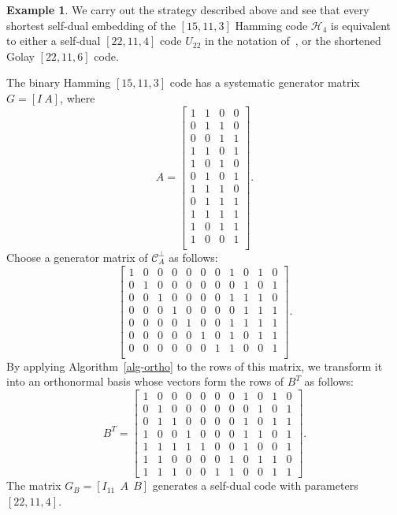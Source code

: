 \documentclass{article}
\theoremstyle{definition}
\newtheorem{example}{Example}[section]
\theoremstyle{remark}
\begin{document}
\begin{example}
We carry out the strategy described above and see that every shortest self-dual embedding of the $[15, 11, 3]$ Hamming code $\mathcal H_4$ is equivalent to either a self-dual $[22, 11, 4]$ code $U_{22}$ in the notation of~\cite{Pless1975}, or the shortened Golay $[22, 11, 6]$ code.

  The binary Hamming $[15, 11, 3]$ code has a systematic generator matrix $G= \left[ I \ A \right]$, where
  \[
    A= \left[\begin{array}{cccc}
       1& 1& 0& 0 \\
       0 &1& 1& 0 \\
       0& 0& 1& 1 \\
       1& 1& 0& 1 \\
       1& 0& 1& 0 \\
       0& 1& 0& 1 \\
       1& 1& 1& 0 \\
       0& 1& 1& 1 \\
       1& 1& 1& 1 \\
       1& 0& 1& 1 \\
       1& 0& 0& 1 \\
    \end{array}\right].
  \]
 Choose a generator matrix of $\mathcal{C}_A^\perp$ as follows:
  \[ \left[\begin{array}{ccccccccccc}
    1& 0 &0& 0& 0& 0& 0 &1& 0& 1& 0 \\
    0& 1& 0& 0& 0& 0& 0& 0& 1& 0& 1 \\
    0& 0& 1& 0& 0& 0& 0& 1& 1& 1& 0 \\
    0& 0& 0& 1& 0& 0& 0& 0& 1& 1& 1 \\
    0& 0& 0& 0& 1& 0& 0& 1& 1 &1 &1 \\
    0& 0& 0& 0& 0& 1& 0& 1& 0& 1& 1 \\
    0& 0& 0& 0& 0& 0& 1& 1& 0& 0& 1 \\
    \end{array}\right].
  \]
By applying Algorithm~\ref{alg-ortho} to the rows of this matrix, we transform it into an orthonormal basis whose vectors form the rows of $B^T$ as follows:
    \[
      B^T=\left[\begin{array}{ccccccccccc}
      1 &0& 0& 0& 0& 0& 0& 1 &0 &1& 0 \\
      0 &1 &0& 0& 0 &0 &0 &0 &1& 0 &1 \\
      0& 1& 1& 0& 0& 0& 0& 1& 0& 1& 1 \\
      1& 0 &0& 1& 0& 0& 0& 1& 1& 0& 1 \\
      1& 1& 1& 1& 1& 0& 0& 1& 0& 0& 1 \\
      1& 1& 0& 0& 0& 0& 1& 0& 1& 1& 0 \\
      1 &1 &1 &0& 0& 1& 1& 0& 0& 1& 1
    \end{array}\right].
    \]
    The matrix $G_B= \left[ I_{11} ~\ A ~\ B \right]$ generates a self-dual code with parameters $[22, 11, 4]$.


\end{example}
\end{document}
